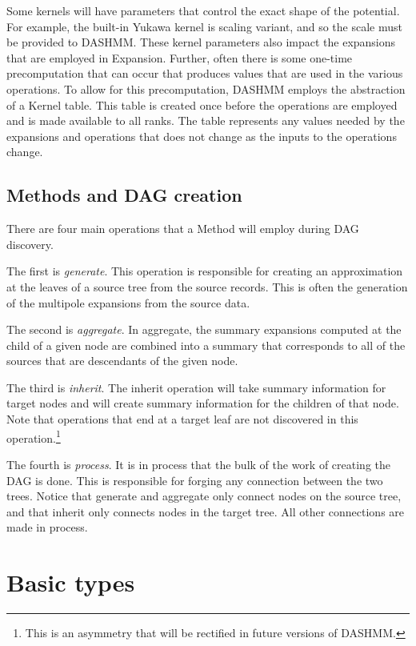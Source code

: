 Some kernels will have parameters that control the exact shape of the potential.
For example, the built-in Yukawa kernel is scaling variant, and so the
scale must be provided to DASHMM. These kernel parameters also impact the
expansions that are employed in Expansion. Further, often there is some one-time
precomputation that can occur that produces values that are used in the various
operations. To allow for this precomputation, DASHMM employs the abstraction
of a Kernel table. This table is created once before the operations are employed
and is made available to all ranks. The table represents any values needed
by the expansions and operations that does not change as the inputs to the
operations change.

\subsection{Methods and DAG creation}

There are four main operations that a Method will employ during DAG discovery.

The first is \emph{generate}. This operation is responsible for creating an
approximation at the leaves of a source tree from the source records. This is
often the generation of the multipole expansions from the source data.

The second is \emph{aggregate}. In aggregate, the summary expansions computed
at the child of a given node are combined into a summary that corresponds to
all of the sources that are descendants of the given node.

The third is \emph{inherit}. The inherit operation will take summary
information for target nodes and will create summary information for the
children of that node. Note that operations that end at a target leaf are not
discovered in this operation.\footnote{This is an asymmetry that will be
rectified in future versions of DASHMM.}

The fourth is \emph{process}. It is in process that the bulk of the work of
creating the DAG is done. This is responsible for forging any connection
between the two trees. Notice that generate and aggregate only connect nodes
on the source tree, and that inherit only connects nodes in the target tree.
All other connections are made in process.


\section{Basic types}

